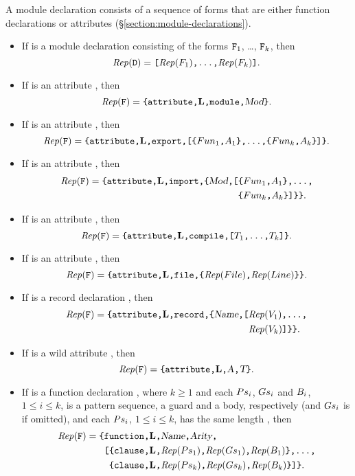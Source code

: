 A module declaration consists of a sequence of forms that are either
function declarations or attributes
(\S\ref{section:module-declarations}).
\begin{itemize}
\item If  is a module declaration consisting of the forms
${\tt{\sl F}}_1$, \ldots, ${\tt{\sl F}}_k$, then
\[\Rep(\TZ{D}) = \text{\T{[$\Rep(\Z{F}_1)$,\tdots,$\Rep(\Z{F}_k)$]}}.\]
\item If  is an attribute , then
\[{\rm{\it Rep}}({\tt{\sl F}}) = \text{{\tt\{attribute,{\rm{\bf L}},module,{\sl Mod}\}}}.\]
\item If  is an attribute , then
\[\Rep(\TZ{F}) = \text{\T{\{attribute,\LINE,export,[\{$\Z{Fun}_1$,$\Z{A}_1$\},\tdots,\{$\Z{Fun}_k$,$\Z{A}_k$\}]\}}}.\]
\item If  is an attribute ,
then
\begin{align*}
\Rep(\TZ{F}) =
\text{\T{\{attribute,\LINE,import,\{\Z{Mod},[}}&\text{\T{\{$\Z{Fun}_1$,$\Z{A}_1$\},\tdots,}} \\
                                               &\text{\T{\{$\Z{Fun}_k$,$\Z{A}_k$\}]\}\}}.}
\end{align*}
\item If  is an attribute , then
\[\Rep(\TZ{F}) = \text{\T{\{attribute,\LINE,compile,[$\Z{T}_1$,\tdots,$\Z{T}_k$]\}}}.\]
\item If  is an attribute , then
\[{\rm{\it Rep}}({\tt{\sl F}}) = \text{{\tt\{attribute,{\rm{\bf L}},file,\{${\rm{\it Rep}}({\sl File})$,${\rm{\it Rep}}({\sl Line})$\}\}}}.\]
\item If  is a record declaration , then
\begin{align*}
\Rep(\TZ{F}) =
\text{\T{\{attribute,\LINE,record,\{\Z{Name},[}}&\text{\T{$\Rep(\Z{V}_1)$,\tdots,}} \\
                                                &\text{\T{$\Rep(\Z{V}_k)$]\}\}}.}
\end{align*}
\item If  is a wild attribute , then
\[{\rm{\it Rep}}({\tt{\sl F}}) = \text{{\tt\{attribute,{\rm{\bf L}},{\sl A},{\sl T}\}}}.\]
\item If  is a function declaration ,
where $k\geq1$ and each ${\sl Ps}_i$, ${\sl Gs}_i$ and ${\sl B}_i$, $1\leq i\leq k$,
is a pattern sequence, a guard and a body, respectively (and ${\sl Gs}_i$ is  if
omitted), and each ${\sl Ps}_i$, $1\leq i\leq k$, has the same length , then
\begin{align*}
\Rep(\TZ{F}) =
\text{\T{\{}}&\text{\T{function,\LINE,\Z{Name},\Z{Arity},}} \\
             &\text{\T{[\{clause,\LINE,$\Rep(\Z{Ps}_1)$,$\Rep(\Z{Gs}_1)$,$\Rep(\Z{B}_1)$\},\tdots,}} \\
             &\text{\T{~\{clause,\LINE,$\Rep(\Z{Ps}_k)$,$\Rep(\Z{Gs}_k)$,$\Rep(\Z{B}_k)$\}]\}}.}
\end{align*}
\end{itemize}
